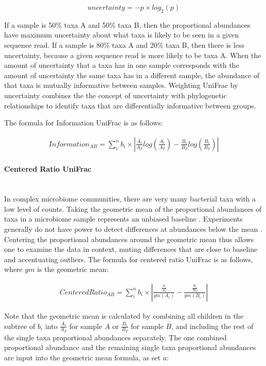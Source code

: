 \documentclass[10pt,letterpaper]{article}
\begin{document}
\begin{equation}\label{eq:schemeP} 
uncertainty = - p  \times log_{2}(p)
\end{equation}

If a sample is 50\% taxa A and 50\% taxa B, then the proportional abundances have maximum uncertainty about what taxa is likely to be seen in a given sequence read. If a sample is 80\% taxa A and 20\% taxa B, then there is less uncertainty, because a given sequence read is more likely to be taxa A. When the amount of uncertainty that a taxa has in one sample corresponds with the amount of uncertainty the same taxa has in a different sample, the abundance of that taxa is mutually informative between samples. Weighting UniFrac by uncertainty combines the the concept of uncertainty with phylogenetic relationships to identify taxa that are differentially informative between groups.

The formula for Information UniFrac is as follows:

\begin{align*}
Information_{AB} = \sum_{i}^{n} b_{i} \times \left| \frac{A_{i}}{A_{T}}log\left(\frac{A_{i}}{A_{T}}\right) - \frac{B_{i}}{B_{T}}log\left(\frac{B_{i}}{B_{T}}\right) \right|
\end{align*}

\paragraph{Centered Ratio UniFrac}\mbox{}\\
In complex microbiome communities, there are very many bacterial taxa with a low level of counts. Taking the geometric mean of the proportional abundances of taxa in a microbiome sample represents an unbiased baseline \cite{aitchison1982statistical}. Experiments generally do not have power to detect differences at abundances below the mean \cite{fernandes2013anova}. Centering the proportional abundances around the geometric mean thus allows one to examine the data in context, muting differences that are close to baseline and accentuating outliers. The formula for centered ratio UniFrac is as follows, where $gm$ is the geometric mean:

\begin{align*}
Centered Ratio_{AB} = \sum_{i}^{n} b_{i} \times \left| \frac{\frac{A_{i}}{A_{T}}}{gm(A_{i})} - \frac{\frac{B_{i}}{B_{T}}}{{gm(B_{i})}} \right|
\end{align*}

Note that the geometric mean is calculated by combining all children in the subtree of $b_{i}$ into $\frac{A_{i}}{A_{T}}$ for sample $A$ or $\frac{B_{i}}{B_{T}}$ for sample $B$, and including the rest of the single taxa proportional abundances separately. The one combined proportional abundance and the remaining single taxa proportional abundances are input into the geometric mean formula, as set $a$:
\end{document}
